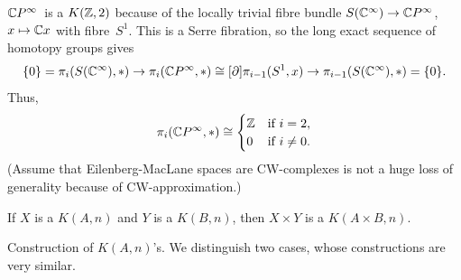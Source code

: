 \documentclass[language=english]{TemplateLecture}
\begin{document}
\begin{example}
    \(\mathbb{C} P^{\infty}\)~is a \(K(\mathbb{Z},2)\) because of the locally trivial fibre bundle \(S(\mathbb{C}^{\infty}) \to \mathbb{C} P^{\infty}\), \(x \mapsto \mathbb{C} x\) with fibre~\(S^1\). 
    This is a Serre fibration, so the long exact sequence of homotopy groups gives
    \begin{equation*}
        \{0\} = \pi_i(S(\mathbb{C}^{\infty}), *) \to \pi_i(\mathbb{C} P^{\infty}, *) \cong[\partial] \pi_{i-1}(S^1, x) \to \pi_{i-1}(S(\mathbb{C}^{\infty}), *) = \{0\}.
    \end{equation*}
    Thus,
    \begin{equation*}
        \pi_i(\mathbb{C} P^{\infty}, *) \cong
        \begin{cases}
            \mathbb{Z} & \text{if } i = 2, \\
            0 & \text{if } i \ne 0.
        \end{cases}
    \end{equation*}
    (Assume that Eilenberg-MacLane spaces are CW-complexes is not a huge loss of generality because of CW-approximation\@.)
\end{example}

\begin{example}
    If \(X\) is a \(K(A,n)\) and \(Y\) is a \(K(B,n)\), then \(X \times Y\) is a \(K(A \times B, n)\).
\end{example}

Construction of \(K(A,n)\)'s.
We distinguish two cases, whose constructions are very similar.
\end{document}

